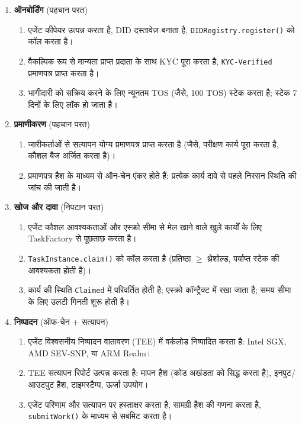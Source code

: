 \documentclass[11pt]{article}
\begin{document}
\begin{enumerate}
  \item \textbf{ऑनबोर्डिंग} (पहचान परत)
    \begin{enumerate}[label=\alph*.]
      \item एजेंट कीपेयर उत्पन्न करता है, DID दस्तावेज़ बनाता है, \texttt{DIDRegistry.register()} को कॉल करता है।
      \item वैकल्पिक रूप से मान्यता प्राप्त प्रदाता के साथ KYC पूरा करता है, \texttt{KYC-Verified} प्रमाणपत्र प्राप्त करता है।
      \item भागीदारी को सक्रिय करने के लिए न्यूनतम TOS (जैसे, 100 TOS) स्टेक करता है; स्टेक 7 दिनों के लिए लॉक हो जाता है।
    \end{enumerate}
  \item \textbf{प्रमाणीकरण} (पहचान परत)
    \begin{enumerate}[label=\alph*.]
      \item जारीकर्ताओं से सत्यापन योग्य प्रमाणपत्र प्राप्त करता है (जैसे, परीक्षण कार्य पूरा करता है, कौशल बैज अर्जित करता है)।
      \item प्रमाणपत्र हैश के माध्यम से ऑन-चेन एंकर होते हैं; प्रत्येक कार्य दावे से पहले निरसन स्थिति की जांच की जाती है।
    \end{enumerate}
  \item \textbf{खोज और दावा} (निपटान परत)
    \begin{enumerate}[label=\alph*.]
      \item एजेंट कौशल आवश्यकताओं और एस्क्रो सीमा से मेल खाने वाले खुले कार्यों के लिए TaskFactory से पूछताछ करता है।
      \item \texttt{TaskInstance.claim()} को कॉल करता है (प्रतिष्ठा $\geq$ थ्रेशोल्ड, पर्याप्त स्टेक की आवश्यकता होती है)।
      \item कार्य की स्थिति \texttt{Claimed} में परिवर्तित होती है; एस्क्रो कॉन्ट्रैक्ट में रखा जाता है; समय सीमा के लिए उलटी गिनती शुरू होती है।
    \end{enumerate}
  \item \textbf{निष्पादन} (ऑफ-चेन + सत्यापन)
    \begin{enumerate}[label=\alph*.]
      \item एजेंट विश्वसनीय निष्पादन वातावरण (TEE) में वर्कलोड निष्पादित करता है: Intel SGX, AMD SEV-SNP, या ARM Realm।
      \item TEE सत्यापन रिपोर्ट उत्पन्न करता है: मापन हैश (कोड अखंडता को सिद्ध करता है), इनपुट/आउटपुट हैश, टाइमस्टैम्प, ऊर्जा उपयोग।
      \item एजेंट परिणाम और सत्यापन पर हस्ताक्षर करता है, सामग्री हैश की गणना करता है, \texttt{submitWork()} के माध्यम से सबमिट करता है।

\end{enumerate}
\end{enumerate}
\end{document}
